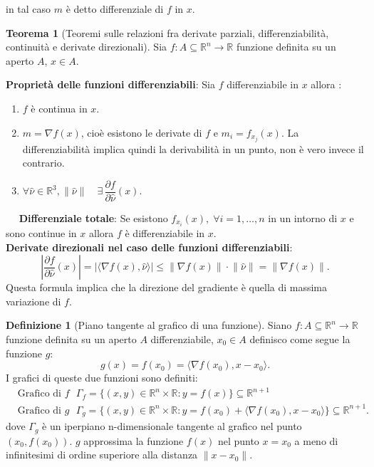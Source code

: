 \documentclass[leqno]{article}
\theoremstyle{definition}
\newtheorem{definition}{Definizione}[section]
\numberwithin{equation}{section}
\newtheorem{theorem}{Teorema}[section]
\theoremstyle{remark}
\begin{document}
	in tal caso $m$ è detto differenziale di $f$ in $x$.
	
	\begin{theorem}[Teoremi sulle relazioni fra derivate parziali, differenziabilità, continuità e derivate direzionali]
		Sia $f:A\subseteq \mathbb{R}^n \rightarrow \mathbb{R}$ funzione definita su un aperto $A$, $ {x} \in A$.
		\newline
		
		\textbf{Proprietà delle funzioni differenziabili}:
		Sia $f$ differenziabile in $x$ allora :
		\begin{enumerate}
			\item $f$ è continua in $x$.
			\item $m=\nabla f (x)$, cioè esistono le derivate di $f$ e $m_i=f_{x_j}(x).$ La differenziabilità implica quindi la derivabilità in un punto, non è vero invece il contrario.
			\item $\forall \hat{\nu} \in \mathbb{R}^3, \lVert \hat{\nu} \rVert \quad \exists \, \dfrac{\partial f }{\partial \hat{\nu}}(x)$.
		\end{enumerate} 
		$\quad$ \textbf{Differenziale totale}: Se esistono $f_{x_i}(x), \; \forall i = 1, \dots ,n$ in un intorno di $x$ e sono continue in $x$ allora $f$ è differenziabile in $x$.
		\\
		\textbf{Derivate direzionali nel caso delle funzioni differenziabili}: 
		\begin{equation}
			\left| \dfrac{\partial f}{\partial \hat{\nu}}(x) \right|=\left| \langle \nabla f(x), \hat{\nu}\rangle \right| \le \lVert \nabla f(x)\rVert \cdot \lVert \hat{\nu} \rVert = \lVert \nabla f(x) \rVert.
		\end{equation}
		Questa formula implica che la direzione del gradiente è quella di massima variazione di $f$.
	\end{theorem}
	
	\begin{definition}[Piano tangente al grafico di una funzione]
		Siano $f:A\subseteq \mathbb{R}^n \rightarrow \mathbb{R}$ funzione definita su un aperto $A$ differenziabile, $ {x_0} \in A$ definisco come segue la funzione $g$:
		\begin{equation}
			g(x) = f(x_0)=\langle \nabla f (x_0) , x-x_0\rangle .
		\end{equation}
		I grafici di queste due funzioni sono definiti:
		\begin{equation}
			\begin{aligned}
				&\text{Grafico di $f$ } \Gamma_f =\{ (x,y)\in \mathbb{R}^n \times \mathbb{R} : y = f(x) \} \subseteq \mathbb{R}^{n+1} \\
				&\text {Grafico di $g$ } \Gamma_g = \{ (x,y)\in \mathbb{R}^n \times \mathbb{R} : y = f(x_0) + \langle \nabla f(x_0) , x - x_0 \rangle \} \subseteq \mathbb{R}^{n+1}.
			\end{aligned}
		\end{equation}
		dove $\Gamma_g$ è un iperpiano n-dimensionale tangente al grafico nel punto $(x_0,f(x_0))$. $g$ approssima la funzione $f(x)$ nel punto $x=x_0$ a meno di infinitesimi di ordine superiore alla distanza $\lVert x-x_0 \rVert$.
	\end{definition}
	
\end{document}
